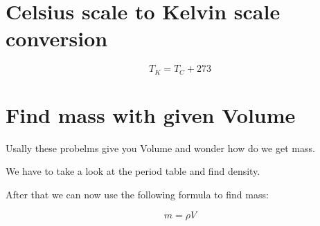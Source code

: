 \documentclass{article}
\begin{document}
\section*{Celsius scale to Kelvin scale conversion}
\begin{tcolorbox}
    \begin{equation}
        T_K = T_C + 273
    \end{equation}
\end{tcolorbox}

\section*{Find mass with given Volume}
Usally these probelms give you Volume and wonder how do we get mass.

We have to take a look at the period table and find density.

After that we can now use the following formula to find mass:

\begin{tcolorbox}
    \begin{equation}
        m = \rho V
    \end{equation}
\end{tcolorbox}
\end{document}
